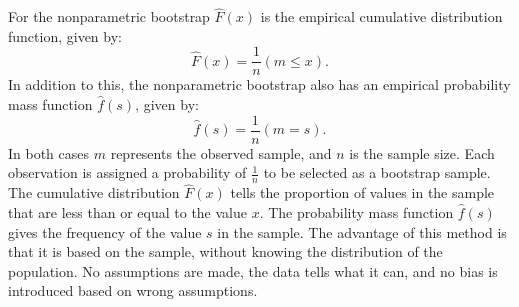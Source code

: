 For the nonparametric bootstrap $\hat{F}(x)$ is the empirical cumulative distribution function, given by:
\begin{equation}
\hat{F}(x)=\frac{1}{n}(m\leq x).
\end{equation}
In addition to this, the nonparametric bootstrap also has an empirical probability mass function $\hat{f}(s)$, given by:
\begin{equation}
	\hat{f}(s)=\frac{1}{n}(m=s).
\end{equation}
In both cases $m$ represents the observed sample, and $n$ is the sample size. Each observation is assigned a probability of $\frac{1}{n}$ to be selected as a bootstrap sample. The  cumulative distribution $\hat{F}(x)$ tells the proportion of values in the sample that are less than or equal to the value $x$. The probability mass function $\hat{f}(s)$ gives the frequency of the value $s$ in the sample. The advantage of this method is that it is based on the sample, without knowing the distribution of the population. No assumptions are made, the data tells what it can, and no bias is introduced based on wrong assumptions.